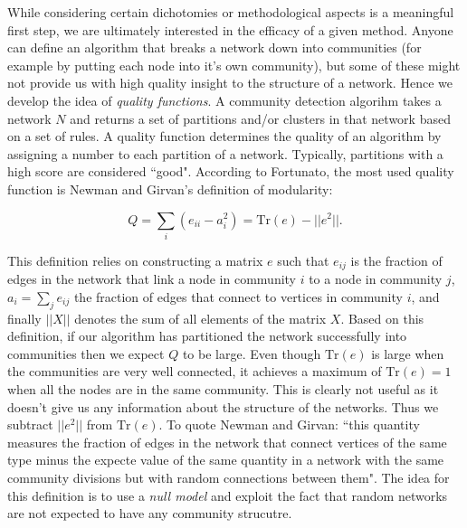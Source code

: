 While considering certain dichotomies or methodological aspects is a meaningful first step, we are ultimately interested in the efficacy of a given method. Anyone can define an algorithm that breaks a network down into communities (for example by putting each node into it's own community), but some of these might not provide us with high quality insight to the structure of a network. Hence we develop the idea of \emph{quality functions}. A community detection algorihm takes a network $N$ and returns a set of partitions and/or clusters in that network based on a set of rules. A quality function determines the quality of an algorithm by assigning a number to each partition of a network. Typically, partitions with a high score are considered ``good". According to Fortunato, the most used quality function is Newman and Girvan's definition of modularity\cite[8]{newman_girvan}:

$$ Q = \sum_i (e_{ii} - a_i^2) = \text{Tr}(e) - ||e^2||. $$

This definition relies on constructing a matrix $e$ such that $e_{ij}$ is the fraction of edges in the network that link a node in community $i$ to a node in community $j$, $a_i = \sum_j e_{ij}$ the fraction of edges that connect to vertices in community $i$, and finally $||X||$ denotes the sum of all elements of the matrix $X$. Based on this definition, if our algorithm has partitioned the network successfully into communities then we expect $Q$ to be large. Even though $\text{Tr}(e)$ is large when the communities are very well connected, it achieves a maximum of $\text{Tr}(e) = 1$ when all the nodes are in the same community. This is clearly not useful as it doesn't give us any information about the structure of the networks. Thus we subtract $||e^2||$ from $\text{Tr}(e)$. To quote Newman and Girvan: ``this quantity measures the fraction of edges in the network that connect vertices of the same type minus the expecte value of the same quantity in a network with the same community divisions but with random connections between them". The idea for this definition is to use a \emph{null model} and exploit the fact that random networks are not expected to have any community strucutre.



